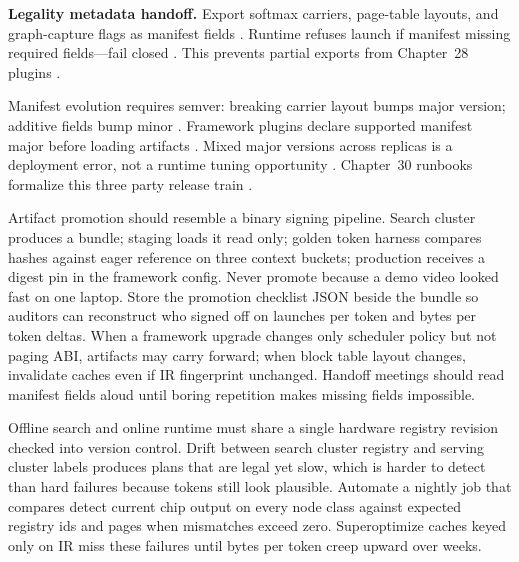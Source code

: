 \textbf{Legality metadata handoff.} Export softmax carriers, page-table layouts, and graph-capture flags as manifest fields \citep{dao2022flashattention,yirage2026,chen2020compilerbasedhardw,nvidia2024cudagraphs,kwon2023vllm,patel2025llminference,memoryfloor2026,taxbreak2026,liu2024deepseekv3,semianalysis2024tma,amd2024aie,amd2024xdna,dao2023flashdecoding,nvidia2022hopper,dlbook}. Runtime refuses launch if manifest missing required fields---fail closed \citep{yirage2026,chen2020compilerbasedhardw,patel2025llminference,dlbook}. This prevents partial exports from Chapter~28 plugins \citep{kwon2023vllm,yirage2026,chen2020compilerbasedhardw,patel2025llminference,memoryfloor2026,taxbreak2026,dao2022flashattention,dlbook}.

Manifest evolution requires semver: breaking carrier layout bumps major version; additive fields bump minor \citep{yirage2026,chen2020compilerbasedhardw,patel2025llminference,dlbook}. Framework plugins declare supported manifest major before loading artifacts \citep{kwon2023vllm,yirage2026,chen2020compilerbasedhardw,patel2025llminference,dlbook}. Mixed major versions across replicas is a deployment error, not a runtime tuning opportunity \citep{yirage2026,chen2020compilerbasedhardw,patel2025llminference,kwon2023vllm,dlbook}. Chapter~30 runbooks formalize this three party release train \citep{yirage2026,chen2020compilerbasedhardw,kwon2023vllm,patel2025llminference,dlbook}.

Artifact promotion should resemble a binary signing pipeline. Search cluster produces a bundle; staging loads it read only; golden token harness compares hashes against eager reference on three context buckets; production receives a digest pin in the framework config. Never promote because a demo video looked fast on one laptop. Store the promotion checklist JSON beside the bundle so auditors can reconstruct who signed off on launches per token and bytes per token deltas. When a framework upgrade changes only scheduler policy but not paging ABI, artifacts may carry forward; when block table layout changes, invalidate caches even if IR fingerprint unchanged. Handoff meetings should read manifest fields aloud until boring repetition makes missing fields impossible.

Offline search and online runtime must share a single hardware registry revision checked into version control. Drift between search cluster registry and serving cluster labels produces plans that are legal yet slow, which is harder to detect than hard failures because tokens still look plausible. Automate a nightly job that compares detect current chip output on every node class against expected registry ids and pages when mismatches exceed zero. Superoptimize caches keyed only on IR miss these failures until bytes per token creep upward over weeks.

